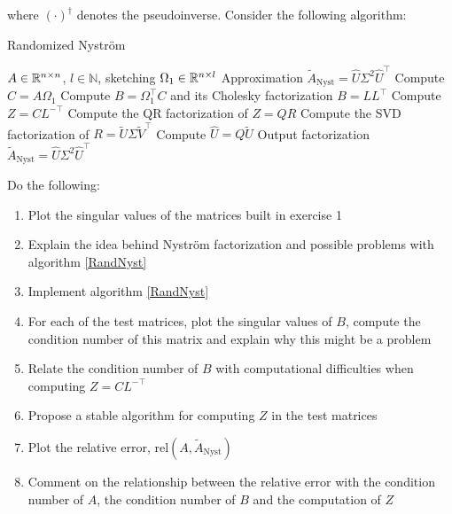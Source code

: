 \documentclass[11pt]{article}
\begin{document}
where $(\cdot)^{\dagger}$ denotes the pseudoinverse. Consider the following algorithm:

\scriptsize
\begin{algorithm}
\caption{Randomized Nyström}\label{RandNyst}
\begin{algorithmic}
\Input $A \in \mathbb{R}^{n \times n}$, $l \in \mathbb{N}$, sketching $\Omega_1 \in \mathbb{R}^{n \times l}$
\Output Approximation $\tilde{A}_{\text{Nyst}} = \hat{U}\Sigma^2 \hat{U}^\top$
\State Compute $C = A\Omega_1$
\State Compute $B = \Omega_1^\top C$ and its Cholesky factorization $B = LL^\top$
\State Compute $Z = CL^{-\top}$
\State Compute the QR factorization of $Z = QR$
\State Compute the SVD factorization of $R = \tilde{U}\Sigma \tilde{V}^{\top}$
\State Compute $\hat{U} = Q\tilde{U}$
\State Output factorization $\tilde{A}_{\text{Nyst}} = \hat{U}\Sigma^2 \hat{U}^\top$
\end{algorithmic}
\end{algorithm}
\normalsize

Do the following:

\begin{enumerate}
    \item Plot the singular values of the matrices built in exercise 1
    \item Explain the idea behind Nyström factorization and possible problems with algorithm \ref{RandNyst}
    \item Implement algorithm \ref{RandNyst}
    \item For each of the test matrices, plot the singular values of $B$, compute the condition number of this matrix and explain why this might be a problem
    \item Relate the condition number of $B$ with computational difficulties when computing $Z = CL^{-\top}$
    \item Propose a stable algorithm for computing $Z$ in the test matrices
    \item Plot the relative error, $\text{rel}(A, \tilde{A}_{\text{Nyst}})$
    \item Comment on the relationship between the relative error with the condition number of $A$, the condition number of $B$ and the computation of $Z$
\end{enumerate}





\end{document}
